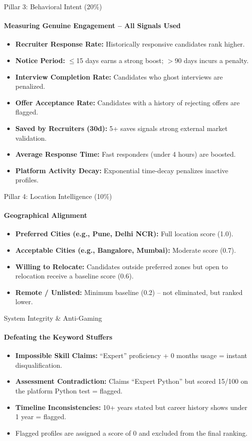 \documentclass[aspectratio=169]{beamer}
\begin{document}
\begin{frame}{Pillar 3: Behavioral Intent (20\%)}
  \framesubtitle{Measuring Genuine Engagement -- All Signals Used}
  \begin{itemize}
    \item \textbf{Recruiter Response Rate:} Historically responsive candidates rank higher.
    \item \textbf{Notice Period:} $\leq$15 days earns a strong boost; $>$90 days incurs a penalty.
    \item \textbf{Interview Completion Rate:} Candidates who ghost interviews are penalized.
    \item \textbf{Offer Acceptance Rate:} Candidates with a history of rejecting offers are flagged.
    \item \textbf{Saved by Recruiters (30d):} 5+ saves signals strong external market validation.
    \item \textbf{Average Response Time:} Fast responders (under 4 hours) are boosted.
    \item \textbf{Platform Activity Decay:} Exponential time-decay penalizes inactive profiles.
  \end{itemize}
\end{frame}

\begin{frame}{Pillar 4: Location Intelligence (10\%)}
  \framesubtitle{Geographical Alignment}
  \begin{itemize}
    \item \textbf{Preferred Cities (e.g., Pune, Delhi NCR):} Full location score (1.0).
    \item \textbf{Acceptable Cities (e.g., Bangalore, Mumbai):} Moderate score (0.7).
    \item \textbf{Willing to Relocate:} Candidates outside preferred zones but open to relocation receive a baseline score (0.6).
    \item \textbf{Remote / Unlisted:} Minimum baseline (0.2) -- not eliminated, but ranked lower.
  \end{itemize}
\end{frame}

\begin{frame}{System Integrity \& Anti-Gaming}
  \framesubtitle{Defeating the Keyword Stuffers}
  \begin{itemize}
    \item \textbf{Impossible Skill Claims:} ``Expert'' proficiency + 0 months usage = instant disqualification.
    \item \textbf{Assessment Contradiction:} Claims ``Expert Python'' but scored 15/100 on the platform Python test = flagged.
    \item \textbf{Timeline Inconsistencies:} 10+ years stated but career history shows under 1 year = flagged.
    \item Flagged profiles are assigned a score of 0 and excluded from the final ranking.
  \end{itemize}
\end{frame}
\end{document}

